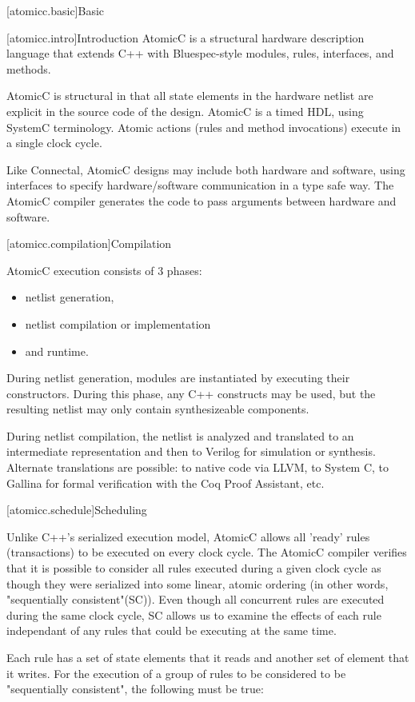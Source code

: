 [atomicc.basic]{Basic}

[atomicc.intro]{Introduction}
AtomicC is a structural hardware description language that extends C++
with Bluespec-style modules, rules, interfaces, and methods.

AtomicC is structural in that all state elements in the hardware
netlist are explicit in the source code of the design. AtomicC is a
timed HDL, using SystemC terminology. 
Atomic actions (rules and method invocations) execute in a single clock cycle.

Like Connectal, AtomicC designs may include both hardware and
software, using interfaces to specify hardware/software communication
in a type safe way. The AtomicC compiler generates the code to pass
arguments between hardware and software.

[atomicc.compilation]{Compilation}

AtomicC execution consists of 3 phases:
\begin{itemize}
\item netlist generation, 
\item netlist compilation or implementation
\item and runtime.
\end{itemize}

During netlist
generation, modules are instantiated by executing their
constructors. During this phase, any C++ constructs may be used, but
the resulting netlist may only contain synthesizeable components.

During netlist compilation, the netlist is analyzed and translated to
an intermediate representation and then to Verilog for simulation or
synthesis. Alternate translations are possible: to native code via
LLVM, to System C, to Gallina for formal verification with the Coq
Proof Assistant, etc.

[atomicc.schedule]{Scheduling}

Unlike C++'s serialized execution model, AtomicC allows all 'ready' rules (transactions) to be executed on
every clock cycle.  The AtomicC compiler verifies that it is possible to consider
all rules executed during a given clock cycle
as though they were serialized into some linear, atomic ordering (in other words, "sequentially consistent"(SC)).
Even though all concurrent rules are executed during the same clock cycle, SC allows us to examine the
effects of each rule independant of any rules that could be executing at the same time.

Each rule has a set of state elements that it reads and another set of element that it writes.
For the execution of a group of rules to be considered to be "sequentially consistent", the following must
be true:


